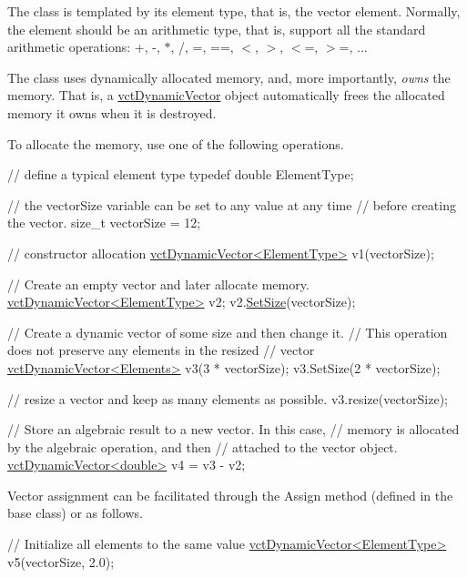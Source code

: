 \begin{DoxyEnumerate}
\item The class is templated by its element type, that is, the vector element. Normally, the element should be an arithmetic type, that is, support all the standard arithmetic operations\-: +, -\/, $\ast$, /, =, ==, $<$, $>$, $<$=, $>$=, ... 
\item The class uses dynamically allocated memory, and, more importantly, {\itshape owns} the memory. That is, a \hyperlink{classvct_dynamic_vector}{vct\-Dynamic\-Vector} object automatically frees the allocated memory it owns when it is destroyed. 
\item To allocate the memory, use one of the following operations. 
\begin{DoxyCode}
\textcolor{comment}{// define a typical element type}
\textcolor{keyword}{typedef} \textcolor{keywordtype}{double} ElementType;

\textcolor{comment}{// the vectorSize variable can be set to any value at any time}
\textcolor{comment}{// before creating the vector.}
\textcolor{keywordtype}{size\_t} vectorSize = 12;

\textcolor{comment}{// constructor allocation}
\hyperlink{classvct_dynamic_vector}{vctDynamicVector<ElementType>} v1(vectorSize);

\textcolor{comment}{// Create an empty vector and later allocate memory.}
\hyperlink{classvct_dynamic_vector}{vctDynamicVector<ElementType>} v2;
v2.\hyperlink{classvct_dynamic_vector_ad48b540760581f3c6b7beeb19e6220f2}{SetSize}(vectorSize);

\textcolor{comment}{// Create a dynamic vector of some size and then change it.}
\textcolor{comment}{// This operation does not preserve any elements in the resized}
\textcolor{comment}{// vector}
\hyperlink{classvct_dynamic_vector}{vctDynamicVector<Elements>} v3(3 * vectorSize);
v3.SetSize(2 * vectorSize);

\textcolor{comment}{// resize a vector and keep as many elements as possible.}
v3.resize(vectorSize);

\textcolor{comment}{// Store an algebraic result to a new vector.  In this case,}
\textcolor{comment}{// memory is allocated by the algebraic operation, and then}
\textcolor{comment}{// attached to the vector object.}
\hyperlink{classvct_dynamic_vector}{vctDynamicVector<double>} v4 = v3 - v2;
\end{DoxyCode}
 
\item Vector assignment can be facilitated through the Assign method (defined in the base class) or as follows. 
\begin{DoxyCode}
\textcolor{comment}{// Initialize all elements to the same value}
\hyperlink{classvct_dynamic_vector}{vctDynamicVector<ElementType>} v5(vectorSize, 2.0);


\end{DoxyCode}
\end{DoxyEnumerate}
